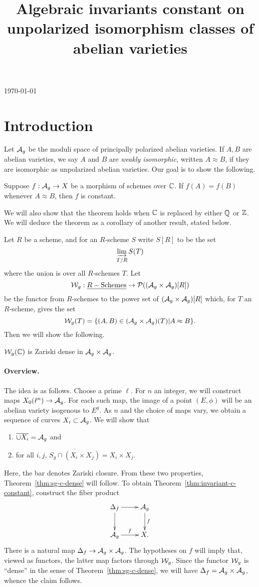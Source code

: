 \documentclass{amsart}
\title[Invariants constant on unpolarized isomorphism classes]{Algebraic invariants constant on unpolarized isomorphism classes of abelian varieties}
\begin{document}
\today
\maketitle

\section{Introduction}
\label{sec:introduction}

Let $\mathcal{A}_g$ be the moduli space of principally polarized abelian varieties. If $A, B$ are abelian varieties, we say $A$ and $B$ are \emph{weakly isomorphic}, written $A \approx B$, if they are isomorphic as unpolarized abelian varieties. Our goal is to show the following.
\begin{theorem}\label{thm:invariant-c-constant}
  Suppose $f: \mathcal{A}_g \to X$ be a morphism of schemes over $\mathbb{C}$. If $f(A) = f(B)$ whenever $A \approx B$, then $f$ is constant.
\end{theorem}
We will also show that the theorem holds when $\mathbb{C}$ is replaced by either $\mathbb{Q}$ or $\mathbb{Z}$. We will deduce the theorem as a corollary of another result, stated below.

Let $R$ be a scheme, and for an $R$-scheme $S$ write $S[R]$ to be the set
\[
  \varinjlim_{T/R} S(T)
\]
where the union is over all $R$-schemes $T$. Let
\[
  \mathcal{W}_g: \underline{R-\textrm{Schemes}} \to \mathcal{P}((\mathcal{A}_g \times \mathcal{A}_g)[R])
\]
be the functor from $R$-schemes to the power set of $(\mathcal{A}_g \times \mathcal{A}_g)[R]$ which, for $T$ an $R$-scheme, gives the set
\[
  \mathcal{W}_g(T) = \{(A,B) \in (\mathcal{A}_g \times \mathcal{A}_g)(T) | A \approx B\}.
\]
Then we will show the following.
\begin{theorem}\label{thm:sg-c-dense}
  $\mathcal{W}_g(\mathbb{C})$ is Zariski dense in $\mathcal{A}_g \times \mathcal{A}_g$.
\end{theorem}

\paragraph{Overview.}

The idea is as follows. Choose a prime $\ell$. For $n$ an integer, we will construct maps $X_0(\ell^n) \to \mathcal{A}_g$. For each such map, the image of a point $(E, \phi)$ will be an abelian variety isogenous to $E^g$. As $n$ and the choice of maps vary, we obtain a sequence of curves $X_i \subset \mathcal{A}_g$. We will show that
\begin{enumerate}
    \item\label{i:curves-dense} $\overline{\cup X_i} = \mathcal{A}_g$ and
    \item\label{i:Sg-dense} for all $i,j$, $\overline{S_g \cap (X_i \times X_j)} = X_i \times X_j$.
\end{enumerate}
Here, the bar denotes Zariski closure. From these two properties, Theorem~\ref{thm:sg-c-dense} will follow. To obtain Theorem~\ref{thm:invariant-c-constant}, construct the fiber product
\[
  \xymatrix{
    \df \ar[r] \ar[d] & \ag \ar[d]^f \\
    \ag \ar[r]^f & X.
  }
\]
There is a natural map $\Delta_f \to \mathcal{A}_g \times \mathcal{A}_g$. The hypotheses on $f$ will imply that, viewed as functors, the latter map factors through $\mathcal{W}_g$. Since the functor $\mathcal{W}_g$ is ``dense'' in the sense of Theorem~\ref{thm:sg-c-dense}, we will have $\Delta_f = \mathcal{A}_g \times \mathcal{A}_g$, whence the claim follows.
\end{document}
